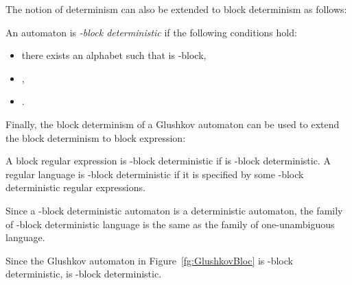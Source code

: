 \documentclass{llncs}
\begin{document}
The notion of determinism can also be extended to block determinism as follows:

\begin{definition}
	An automaton  is \emph{-block deterministic} if the following conditions hold:
		\begin{itemize}
			\item there exists an alphabet  such that  is -block,
			\item ,
			\item .
		\end{itemize}
\end{definition}	

Finally, the block determinism of a Glushkov automaton can be used to extend the block determinism to block expression:

\begin{definition}
	A block regular expression  is -block deterministic if  is -block deterministic.
	A regular language is -block deterministic if it is specified by some -block deterministic regular expressions.
\end{definition}

Since a -block deterministic automaton is a deterministic automaton, the family of -block deterministic language is the same as the family of one-unambi\-guous language.

\begin{example}
	Since the Glushkov automaton in Figure~\ref{fg:GlushkovBloc} is -block deterministic,  is -block deterministic.
\end{example}
	
\end{document}
